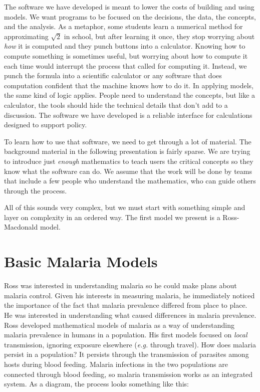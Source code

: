 \documentclass[
]{book}
\begin{document}
The software we have developed is meant to lower the costs of building and using models. We want programs to be focused on the decisions, the data, the concepts, and the analysis. As a metaphor, some students learn a numerical method for approximating \(\sqrt{2}\) in school, but after learning it once, they stop worrying about \emph{how} it is computed and they punch buttons into a calculator. Knowing how to compute something is sometimes useful, but worrying about how to compute it each time would interrupt the process that called for computing it. Instead, we punch the formula into a scientific calculator or any software that does computation confident that the machine knows how to do it. In applying models, the same kind of logic applies. People need to understand the concepts, but like a calculator, the tools should hide the technical details that don't add to a discussion. The software we have developed is a reliable interface for calculations designed to support policy.

To learn how to use that software, we need to get through a lot of material. The background material in the following presentation is fairly sparse. We are trying to introduce just \emph{enough} mathematics to teach users the critical concepts so they know what the software can do. We assume that the work will be done by teams that include a few people who understand the mathematics, who can guide others through the process.

All of this sounds very complex, but we must start with something simple and layer on complexity in an ordered way. The first model we present is a Ross-Macdonald model.

\chapter{Basic Malaria Models}\label{basic-malaria-models}

Ross was interested in understanding malaria so he could make plans about malaria control.
Given his interests in measuring malaria, he immediately noticed the importance of the fact that malaria prevalence differed from place to place.
He was interested in understanding what caused differences in malaria prevalence.
Ross developed mathematical models of malaria as a way of understanding malaria prevalence in humans in a population. His first models focused on \emph{local} transmission, ignoring exposure elsewhere (\emph{e.g.} through travel). How does malaria persist in a population? It persists through the transmission of parasites among hosts during blood feeding. Malaria infections in the two populations are connected through blood feeding, so malaria transmission works as an integrated system. As a diagram, the process looks something like this:
\end{document}
